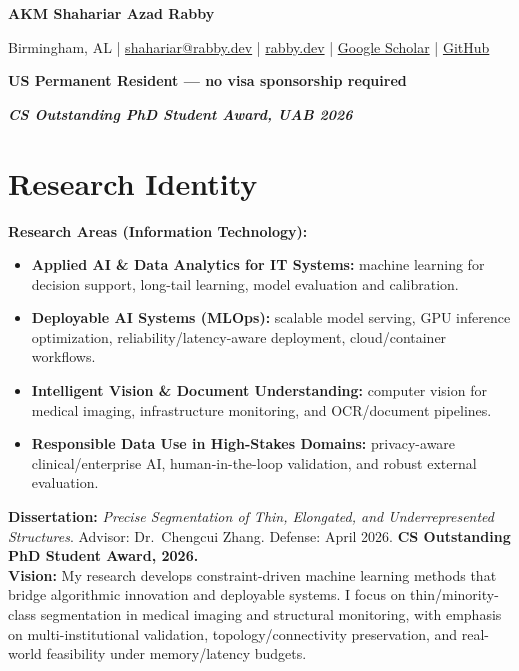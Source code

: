 \documentclass[11pt]{article}
\newcommand{\name}[1]{\begin{center}{\LARGE\bfseries #1}\end{center}}
\newcommand{\contact}[1]{\begin{center}\small #1\end{center}}
\begin{document}
\name{AKM Shahariar Azad Rabby}
\contact{
Birmingham, AL \;\;|\;\;
\href{mailto:shahariar@rabby.dev}{shahariar@rabby.dev} \;\;|\;\;
\href{https://rabby.dev}{rabby.dev} \;\;|\;\;
\href{https://scholar.google.com/citations?user=_Rm1Xk4AAAAJ&hl=en}{Google Scholar} \;\;|\;\;
\href{https://github.com/shahariarrabby}{GitHub}
}
\begin{center}
\small \textbf{US Permanent Resident --- no visa sponsorship required}
\end{center}

\begin{center}
\small \textbf{\textit{CS Outstanding PhD Student Award, UAB \textemdash{} 2026}}
\end{center}

\section{Research Identity}
\noindent
\textbf{Research Areas (Information Technology):}
\begin{itemize}[nosep]
  \item \textbf{Applied AI \& Data Analytics for IT Systems:} machine learning for decision support, long-tail learning, model evaluation and calibration.
  \item \textbf{Deployable AI Systems (MLOps):} scalable model serving, GPU inference optimization, reliability/latency-aware deployment, cloud/container workflows.
  \item \textbf{Intelligent Vision \& Document Understanding:} computer vision for medical imaging, infrastructure monitoring, and OCR/document pipelines.
  \item \textbf{Responsible Data Use in High-Stakes Domains:} privacy-aware clinical/enterprise AI, human-in-the-loop validation, and robust external evaluation.
\end{itemize}
\vspace{2pt}
\textbf{Dissertation:} \textit{Precise Segmentation of Thin, Elongated, and Underrepresented Structures}. Advisor: Dr.\ Chengcui Zhang. Defense: April 2026. \textbf{CS Outstanding PhD Student Award, 2026.}\\[2pt]
\textbf{Vision:} My research develops constraint-driven machine learning methods that bridge algorithmic innovation and deployable systems. I focus on thin/minority-class segmentation in medical imaging and structural monitoring, with emphasis on multi-institutional validation, topology/connectivity preservation, and real-world feasibility under memory/latency budgets.
\end{document}
